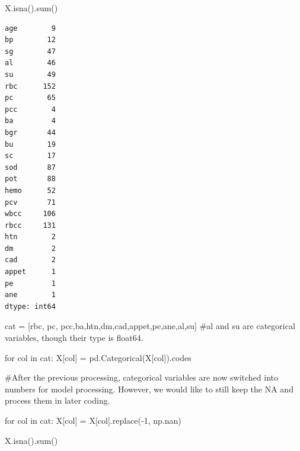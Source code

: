 \documentclass[
  11pt,
  letterpaper,
  DIV=11,
  numbers=noendperiod]{scrartcl}
\newenvironment{Shaded}{\begin{snugshade}}{\end{snugshade}}
\newcommand{\BuiltInTok}[1]{\textcolor[rgb]{0.00,0.23,0.31}{#1}}
\newcommand{\CommentTok}[1]{\textcolor[rgb]{0.37,0.37,0.37}{#1}}
\newcommand{\ControlFlowTok}[1]{\textcolor[rgb]{0.00,0.23,0.31}{#1}}
\newcommand{\DecValTok}[1]{\textcolor[rgb]{0.68,0.00,0.00}{#1}}
\newcommand{\KeywordTok}[1]{\textcolor[rgb]{0.00,0.23,0.31}{#1}}
\newcommand{\NormalTok}[1]{\textcolor[rgb]{0.00,0.23,0.31}{#1}}
\newcommand{\OperatorTok}[1]{\textcolor[rgb]{0.37,0.37,0.37}{#1}}
\newcommand{\StringTok}[1]{\textcolor[rgb]{0.13,0.47,0.30}{#1}}
\begin{document}
\begin{Shaded}
\begin{Highlighting}[]
\NormalTok{X.isna().}\BuiltInTok{sum}\NormalTok{()}
\end{Highlighting}
\end{Shaded}

\begin{verbatim}
age        9
bp        12
sg        47
al        46
su        49
rbc      152
pc        65
pcc        4
ba         4
bgr       44
bu        19
sc        17
sod       87
pot       88
hemo      52
pcv       71
wbcc     106
rbcc     131
htn        2
dm         2
cad        2
appet      1
pe         1
ane        1
dtype: int64
\end{verbatim}

\begin{Shaded}
\begin{Highlighting}[]
\NormalTok{cat }\OperatorTok{=}\NormalTok{ [}\StringTok{\textquotesingle{}rbc\textquotesingle{}}\NormalTok{, }\StringTok{\textquotesingle{}pc\textquotesingle{}}\NormalTok{, }\StringTok{\textquotesingle{}pcc\textquotesingle{}}\NormalTok{,}\StringTok{\textquotesingle{}ba\textquotesingle{}}\NormalTok{,}\StringTok{\textquotesingle{}htn\textquotesingle{}}\NormalTok{,}\StringTok{\textquotesingle{}dm\textquotesingle{}}\NormalTok{,}\StringTok{\textquotesingle{}cad\textquotesingle{}}\NormalTok{,}\StringTok{\textquotesingle{}appet\textquotesingle{}}\NormalTok{,}\StringTok{\textquotesingle{}pe\textquotesingle{}}\NormalTok{,}\StringTok{\textquotesingle{}ane\textquotesingle{}}\NormalTok{,}\StringTok{\textquotesingle{}al\textquotesingle{}}\NormalTok{,}\StringTok{\textquotesingle{}su\textquotesingle{}}\NormalTok{]}
\CommentTok{\#al and su are categorical variables, though their type is float64.}

\ControlFlowTok{for}\NormalTok{ col }\KeywordTok{in}\NormalTok{ cat:}
\NormalTok{    X[col] }\OperatorTok{=}\NormalTok{ pd.Categorical(X[col]).codes}
\end{Highlighting}
\end{Shaded}

\begin{Shaded}
\begin{Highlighting}[]
\CommentTok{\#After the previous processing, categorical variables are now switched into numbers for model processing. However, we would like to still keep the NA and process them in later coding.}

\ControlFlowTok{for}\NormalTok{ col }\KeywordTok{in}\NormalTok{ cat:}
\NormalTok{    X[col] }\OperatorTok{=}\NormalTok{ X[col].replace(}\OperatorTok{{-}}\DecValTok{1}\NormalTok{, np.nan)}


\NormalTok{X.isna().}\BuiltInTok{sum}\NormalTok{()}
\end{Highlighting}
\end{Shaded}
\end{document}
